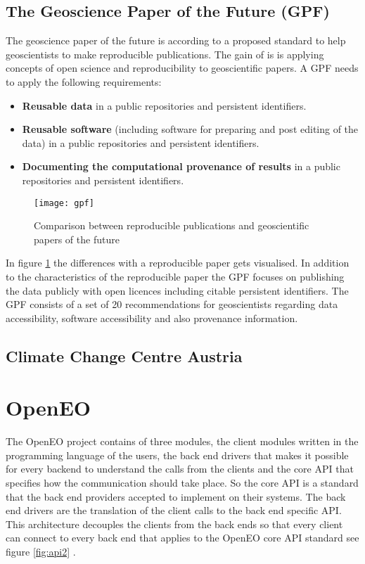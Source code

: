 \documentclass[draft,final]{vutinfth} %
\begin{document}
\subsection{The Geoscience Paper of the Future (GPF)}\label{GPF}
The geoscience paper of the future is according to \cite{Gil2016TowardTG} a proposed standard to help geoscientists to make reproducible publications. The gain of is is applying concepts of open science and reproducibility to geoscientific papers. A GPF needs to apply the following requirements:

\begin{itemize}
	\item \textbf{Reusable data} in a public repositories and persistent identifiers.
	\item \textbf{Reusable software} (including software for preparing and post editing of the data) in a  public repositories and persistent identifiers.
	\item \textbf{Documenting the computational provenance of results} in a public repositories and persistent identifiers.  
\end{itemize}

\begin{figure}[h]
	\centering
	\texttt{[image: gpf]}
	\caption{Comparison between reproducible publications and geoscientific papers of the future \cite{Gil2016TowardTG}}
	\label{fig:gpf} %
\end{figure}

In figure \ref{fig:gpf} the differences with a reproducible paper gets visualised. In addition to the characteristics of the reproducible paper the GPF focuses on publishing the data publicly with open licences including citable persistent identifiers.
The GPF consists of a set of 20 recommendations for geoscientists regarding data accessibility, software accessibility and also provenance information. 

\subsection{Climate Change Centre Austria}

\section{OpenEO}\label{OpenEO}
The OpenEO project contains of three modules, the client modules written in the programming language of the users, the back end drivers that makes it possible for every backend to understand the calls from the clients and the core API that specifies how the communication should take place. So the core API is a standard that the back end providers accepted to implement on their systems. The back end drivers are the translation of the client calls to the back end specific API. This architecture decouples the clients from the back ends so that every client can connect to every back end that applies to the OpenEO core API standard see figure \ref{fig:api2} \cite{openeo}.   
\end{document}
